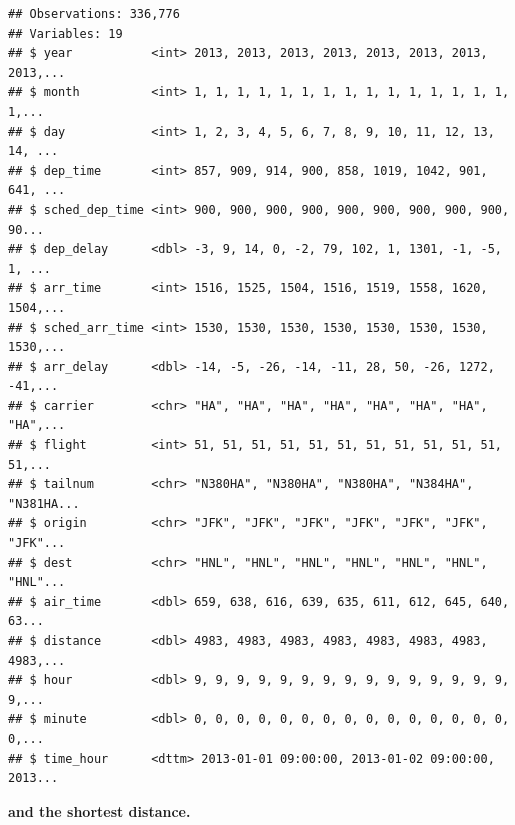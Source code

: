 \documentclass[]{book}
\newenvironment{Shaded}{\begin{snugshade}}{\end{snugshade}}
\newcommand{\KeywordTok}[1]{\textcolor[rgb]{0.13,0.29,0.53}{\textbf{#1}}}
\newcommand{\NormalTok}[1]{#1}
\newcommand{\OperatorTok}[1]{\textcolor[rgb]{0.81,0.36,0.00}{\textbf{#1}}}
\newcommand{\StringTok}[1]{\textcolor[rgb]{0.31,0.60,0.02}{#1}}
\theoremstyle{definition}
\theoremstyle{definition}
\theoremstyle{definition}
\theoremstyle{remark}
\begin{document}
\begin{verbatim}
## Observations: 336,776
## Variables: 19
## $ year           <int> 2013, 2013, 2013, 2013, 2013, 2013, 2013, 2013,...
## $ month          <int> 1, 1, 1, 1, 1, 1, 1, 1, 1, 1, 1, 1, 1, 1, 1, 1,...
## $ day            <int> 1, 2, 3, 4, 5, 6, 7, 8, 9, 10, 11, 12, 13, 14, ...
## $ dep_time       <int> 857, 909, 914, 900, 858, 1019, 1042, 901, 641, ...
## $ sched_dep_time <int> 900, 900, 900, 900, 900, 900, 900, 900, 900, 90...
## $ dep_delay      <dbl> -3, 9, 14, 0, -2, 79, 102, 1, 1301, -1, -5, 1, ...
## $ arr_time       <int> 1516, 1525, 1504, 1516, 1519, 1558, 1620, 1504,...
## $ sched_arr_time <int> 1530, 1530, 1530, 1530, 1530, 1530, 1530, 1530,...
## $ arr_delay      <dbl> -14, -5, -26, -14, -11, 28, 50, -26, 1272, -41,...
## $ carrier        <chr> "HA", "HA", "HA", "HA", "HA", "HA", "HA", "HA",...
## $ flight         <int> 51, 51, 51, 51, 51, 51, 51, 51, 51, 51, 51, 51,...
## $ tailnum        <chr> "N380HA", "N380HA", "N380HA", "N384HA", "N381HA...
## $ origin         <chr> "JFK", "JFK", "JFK", "JFK", "JFK", "JFK", "JFK"...
## $ dest           <chr> "HNL", "HNL", "HNL", "HNL", "HNL", "HNL", "HNL"...
## $ air_time       <dbl> 659, 638, 616, 639, 635, 611, 612, 645, 640, 63...
## $ distance       <dbl> 4983, 4983, 4983, 4983, 4983, 4983, 4983, 4983,...
## $ hour           <dbl> 9, 9, 9, 9, 9, 9, 9, 9, 9, 9, 9, 9, 9, 9, 9, 9,...
## $ minute         <dbl> 0, 0, 0, 0, 0, 0, 0, 0, 0, 0, 0, 0, 0, 0, 0, 0,...
## $ time_hour      <dttm> 2013-01-01 09:00:00, 2013-01-02 09:00:00, 2013...
\end{verbatim}

\textbf{and the shortest distance.}

\begin{Shaded}
\end{Shaded}
\end{document}
